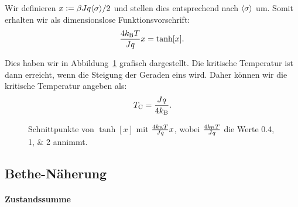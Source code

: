 Wir definieren $x := \beta J q \langle \sigma \rangle / 2$ und stellen dies
entsprechend nach $\langle \sigma \rangle$ um. Somit erhalten wir als dimensionslose
Funktionsvorschrift:
\[
    \frac{4 k_\text B T}{J q} x = \tanh[x].
\]

Dies haben wir in Abbildung~\ref{fig:tanh} grafisch dargestellt. Die kritische
Temperatur ist dann erreicht, wenn die Steigung der Geraden eins wird. Daher
können wir die kritische Temperatur angeben als:
\[
    T_\text C = \frac{Jq}{4 k_\text B}.
\]

\begin{figure}[htbp]
    \centering
    \caption{%
        Schnittpunkte von $\tanh[x]$ mit $\frac{4 k_\text B T}{J q} x$, wobei
        $\frac{4 k_\text B T}{J q}$ die Werte \numlist{0.4;1;2} annimmt.
    }
    \label{fig:tanh}
\end{figure}

\subsection{Bethe-Näherung}

\paragraph{Zustandssumme}

